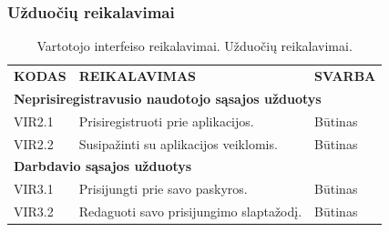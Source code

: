 \documentclass{VUMIFPSkursinis}
\begin{document}
\subsubsection{Užduočių reikalavimai}
\begin{table}[H]
\caption{Vartotojo interfeiso reikalavimai. Užduočių reikalavimai.}
\centering
\normalsize
\begin{tabular}{|p{2cm}|p{10cm}|p{3cm}|}
\hline
\rowcolor{gray!30}
\multicolumn{3}{|l|}{\textbf{2.	Užduočių reikalavimai}} \\ \hline
\textbf{KODAS}& \multicolumn{1}{m{10cm}|}{\textbf{REIKALAVIMAS}} & \textbf{SVARBA} \\ \hline
\multicolumn{3}{|l|}{\textbf{Neprisiregistravusio naudotojo sąsajos užduotys}} \\ \hline
VIR2.1 & \multicolumn{1}{m{10cm}|}{Prisiregistruoti prie aplikacijos.} & Būtinas \\ \hline
VIR2.2 & \multicolumn{1}{m{10cm}|}{Susipažinti su aplikacijos veiklomis.} & Būtinas \\ \hline
\multicolumn{3}{|l|}{\textbf{Darbdavio sąsajos užduotys}} \\ \hline
VIR3.1 & \multicolumn{1}{m{10cm}|}{Prisijungti prie savo paskyros.} & Būtinas \\ \hline
VIR3.2 & \multicolumn{1}{m{10cm}|}{Redaguoti savo prisijungimo slaptažodį.} & Būtinas \\ \hline
\end{tabular}
\end{table}
\end{document}
